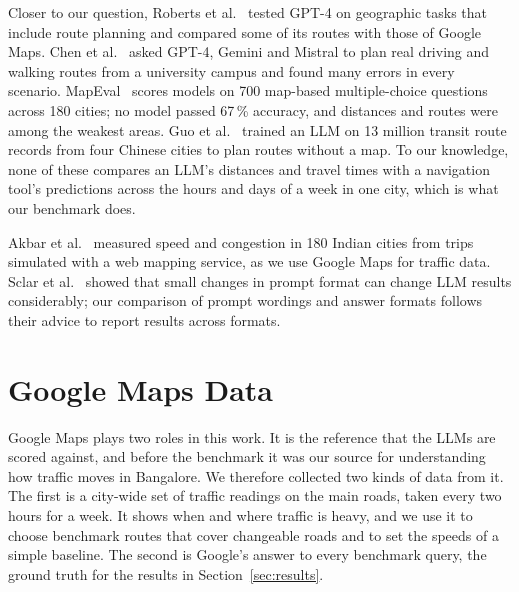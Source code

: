 \documentclass[conference]{IEEEtran}
\begin{document}
Closer to our question, Roberts et al.~\cite{roberts2023} tested GPT-4 on geographic tasks that include route planning and compared some of its routes with those of Google Maps. Chen et al.~\cite{chen2024} asked GPT-4, Gemini and Mistral to plan real driving and walking routes from a university campus and found many errors in every scenario. MapEval~\cite{dihan2025} scores models on 700 map-based multiple-choice questions across 180 cities; no model passed 67\,\% accuracy, and distances and routes were among the weakest areas. Guo et al.~\cite{guo2026} trained an LLM on 13 million transit route records from four Chinese cities to plan routes without a map. To our knowledge, none of these compares an LLM's distances and travel times with a navigation tool's predictions across the hours and days of a week in one city, which is what our benchmark does.

Akbar et al.~\cite{akbar2023} measured speed and congestion in 180 Indian cities from trips simulated with a web mapping service, as we use Google Maps for traffic data. Sclar et al.~\cite{sclar2024} showed that small changes in prompt format can change LLM results considerably; our comparison of prompt wordings and answer formats follows their advice to report results across formats.

\section{Google Maps Data}\label{sec:gmaps}

Google Maps plays two roles in this work. It is the reference that the LLMs are scored against, and before the benchmark it was our source for understanding how traffic moves in Bangalore. We therefore collected two kinds of data from it. The first is a city-wide set of traffic readings on the main roads, taken every two hours for a week. It shows when and where traffic is heavy, and we use it to choose benchmark routes that cover changeable roads and to set the speeds of a simple baseline. The second is Google's answer to every benchmark query, the ground truth for the results in Section~\ref{sec:results}.
\end{document}
